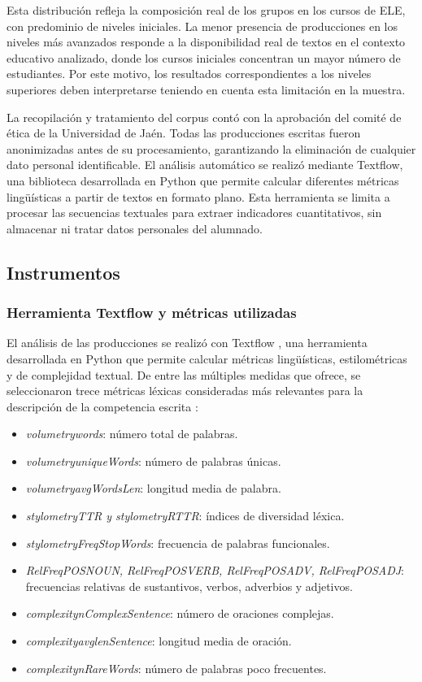\documentclass[spanish]{textolivre}
\begin{document}
Esta distribución refleja la composición real de los grupos en los cursos de ELE, con predominio de niveles iniciales. La menor presencia de producciones en los niveles más avanzados responde a la disponibilidad real de textos en el contexto educativo analizado, donde los cursos iniciales concentran un mayor número de estudiantes. Por este motivo, los resultados correspondientes a los niveles superiores deben interpretarse teniendo en cuenta esta limitación en la muestra.

La recopilación y tratamiento del corpus contó con la aprobación del comité de ética de la Universidad de Jaén. Todas las producciones escritas fueron anonimizadas antes de su procesamiento, garantizando la eliminación de cualquier dato personal identificable. El análisis automático se realizó mediante Textflow, una biblioteca desarrollada en Python que permite calcular diferentes métricas lingüísticas a partir de textos en formato plano. Esta herramienta se limita a procesar las secuencias textuales para extraer indicadores cuantitativos, sin almacenar ni tratar datos personales del alumnado.

\subsection{Instrumentos}

\subsubsection{Herramienta Textflow y métricas utilizadas}
El análisis de las producciones se realizó con Textflow \cite{sinai_textflow2025}, una herramienta desarrollada en Python que permite calcular métricas lingüísticas, estilométricas y de complejidad textual. De entre las múltiples medidas que ofrece, se seleccionaron trece métricas léxicas consideradas más relevantes para la descripción de la competencia escrita \cite{cuberos_vicente2019,robles_garcia2019,vine_jara2021,degraeuwe_goethals2024}:

\begin{itemize}
    \item \textit{volumetrywords}: número total de palabras.
    \item \textit{volumetryuniqueWords}: número de palabras únicas.
    \item \textit{volumetryavgWordsLen}: longitud media de palabra.
    \item \textit{stylometryTTR y stylometryRTTR}: índices de diversidad léxica.
    \item \textit{stylometryFreqStopWords}: frecuencia de palabras funcionales.
    \item \textit{RelFreqPOSNOUN, RelFreqPOSVERB, RelFreqPOSADV, RelFreqPOSADJ}: frecuencias relativas de sustantivos, verbos, adverbios y adjetivos.
    \item \textit{complexitynComplexSentence}: número de oraciones complejas.
    \item \textit{complexityavglenSentence}: longitud media de oración.
    \item \textit{complexitynRareWords}: número de palabras poco frecuentes.
\end{itemize}
\end{document}
